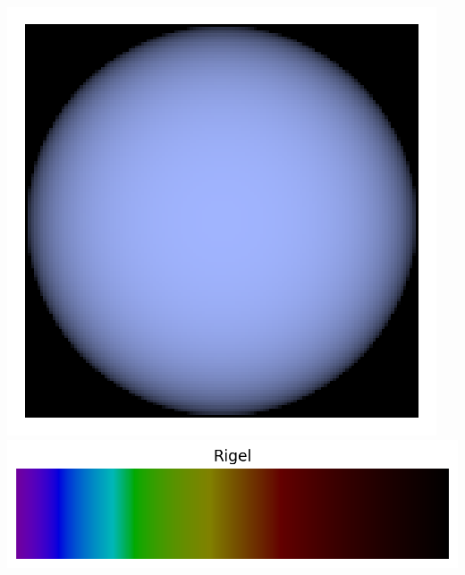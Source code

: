 \documentclass[12pt,a4paper,fleqn]{article}
\begin{document}
\begin{center}
\includegraphics[height=\localheight]{images/star_rigel.png}
\includegraphics[height=\localheight]{images/spectrum_star_rigel.png}


\end{center}
\end{document}

